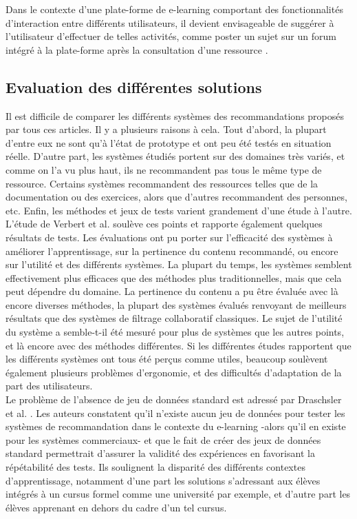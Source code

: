 \documentclass[conference]{./sty/IEEEtran}
\begin{document}
Dans le contexte d'une plate-forme de e-learning comportant des fonctionnalités
d'interaction entre différents utilisateurs, il devient envisageable de
suggérer à l'utilisateur d'effectuer de telles activités, comme poster un sujet
sur un forum intégré à la plate-forme après la consultation d'une ressource
\cite{Liou:2014:CPL:2617848.2617854}. \\

\subsection{Evaluation des différentes solutions}

Il est difficile de comparer les différents systèmes des recommandations
proposés par tous ces articles. Il y a plusieurs raisons à cela. Tout d'abord,
la plupart d'entre eux ne sont qu'à l'état de prototype et ont peu été testés
en situation réelle. D'autre part, les systèmes étudiés portent sur des
domaines très variés, et comme on l'a vu plus haut, ils ne recommandent pas
tous le même type de ressource. Certains systèmes recommandent des ressources
telles que de la documentation ou des exercices, alors que d'autres
recommandent des personnes, etc. Enfin, les méthodes et jeux de tests varient
grandement d'une étude à l'autre. \\

L'étude de Verbert et al. \cite{DBLP:journals/tlt/VerbertMOWDBD12} soulève ces
points et rapporte également quelques résultats de tests. Les évaluations ont
pu porter sur l'efficacité des systèmes à améliorer l'apprentissage, sur la
pertinence du contenu recommandé, ou encore sur l'utilité et des différents
systèmes. La plupart du temps, les systèmes semblent effectivement plus
efficaces que des méthodes plus traditionnelles, mais que cela peut dépendre du
domaine. La pertinence du contenu a pu être évaluée avec là encore diverses
méthodes, la plupart des systèmes évalués renvoyant de meilleurs résultats que
des systèmes de filtrage collaboratif classiques. Le sujet de l'utilité du
système a semble-t-il été mesuré pour plus de systèmes que les autres points,
et là encore avec des méthodes différentes. Si les différentes études
rapportent que les différents systèmes ont tous été perçus comme utiles,
beaucoup soulèvent également plusieurs problèmes d'ergonomie, et des
difficultés d'adaptation de la part des utilisateurs.\\

Le problème de l'absence de jeu de données standard est adressé par Draschsler
et al. \cite{DBLP:journals/procedia/DrachslerBVVDMBLSFW10}. Les auteurs
constatent qu'il n'existe aucun jeu de données pour tester les systèmes de
recommandation dans le contexte du e-learning -alors qu'il en existe pour les
systèmes commerciaux- et que le fait de créer des jeux de données standard
permettrait d'assurer la validité des expériences en favorisant la répétabilité
des tests. Ils soulignent la disparité des différents contextes
d'apprentissage, notamment d'une part les solutions s'adressant aux élèves
intégrés à un cursus formel comme une université par exemple, et d'autre part
les élèves apprenant en dehors du cadre d'un tel cursus.\\
\end{document}
